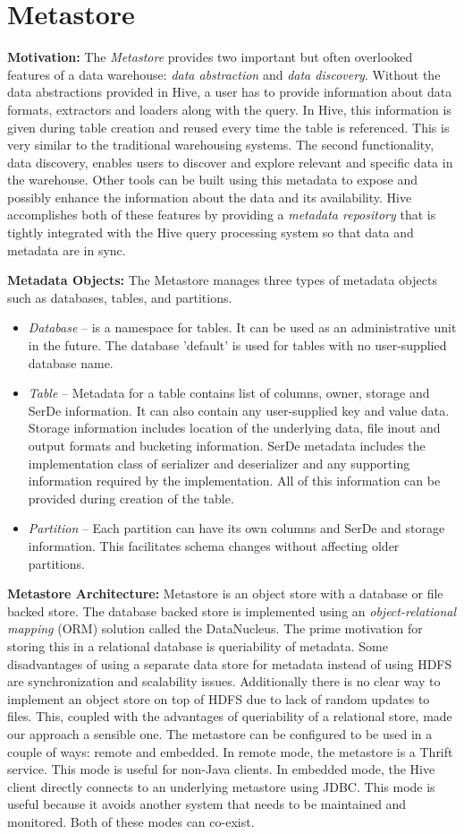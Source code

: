\documentclass[twocolumn]{article}
\newcommand{\bi}{\begin{itemize}}
\newcommand{\ei}{\end{itemize}}
\newcommand{\ii}{\item}
\begin{document}
\section{Metastore}

\textbf{Motivation:} The \textit{Metastore} provides two important but often overlooked features of a data warehouse: 
\textit{data abstraction} and \textit{data discovery}. 
Without the data abstractions provided in Hive, a user has to provide information about data formats, extractors and loaders along with the query. In Hive, this information is given during table creation and reused every time the table is referenced. 
This is very similar to the traditional warehousing systems. The second functionality, data discovery, enables users to discover and explore relevant and specific data in the warehouse. Other tools can be built using this metadata to expose and possibly enhance the information about the data and its availability. 
Hive accomplishes both of these features by providing a \textit{metadata repository} that is tightly integrated with the Hive query processing system so that data and metadata are in sync.

\noindent
\textbf{Metadata Objects:}
The Metastore manages three types of metadata objects such as databases, tables, and partitions.
\bi 
\ii \textit{Database} – is a namespace for tables. It can be used as an administrative unit in the future. The database 'default' is used for tables with no user-supplied database name.
\ii \textit{Table} – Metadata for a table contains list of columns, owner, storage and SerDe information. It can also contain any user-supplied key and value data. Storage information includes location of the underlying data, file inout and output formats and bucketing information. SerDe metadata includes the implementation class of serializer and deserializer and any supporting information required by the implementation. All of this information can be provided during creation of the table.
\ii \textit{Partition} – Each partition can have its own columns and SerDe and storage information. This facilitates schema changes without affecting older partitions.
\ei

\noindent
\textbf{Metastore Architecture:} Metastore is an object store with a database or file backed store. The database backed store is implemented using an \textit{object-relational mapping} (ORM) solution called the DataNucleus. The prime motivation for storing this in a relational database is queriability of metadata. Some disadvantages of using a separate data store for metadata instead of using HDFS are synchronization and scalability issues. Additionally there is no clear way to implement an object store on top of HDFS due to lack of random updates to files. This, coupled with the advantages of queriability of a relational store, made our approach a sensible one.
The metastore can be configured to be used in a couple of ways: remote and embedded. In remote mode, the metastore is a Thrift service. This mode is useful for non-Java clients. In embedded mode, the Hive client directly connects to an underlying metastore using JDBC. This mode is useful because it avoids another system that needs to be maintained and monitored. Both of these modes can co-exist.
\end{document}
